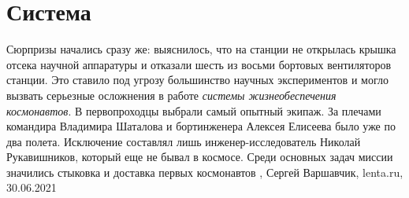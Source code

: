  
 
 
 
 
\chapter{Система}
\label{sec:slova.sistema}

Сюрпризы начались сразу же: выяснилось, что на станции не открылась крышка
отсека научной аппаратуры и отказали шесть из восьми бортовых вентиляторов
станции. Это ставило под угрозу большинство научных экспериментов и могло
вызвать серьезные осложнения в работе \emph{системы жизнеобеспечения
космонавтов}.  В первопроходцы выбрали самый опытный экипаж. За плечами
командира Владимира Шаталова и бортинженера Алексея Елисеева было уже по два
полета. Исключение составлял лишь инженер-исследователь Николай Рукавишников,
который еще не бывал в космосе. Среди основных задач миссии значились стыковка
и доставка первых космонавтов
, Сергей Варшавчик, lenta.ru, 30.06.2021


